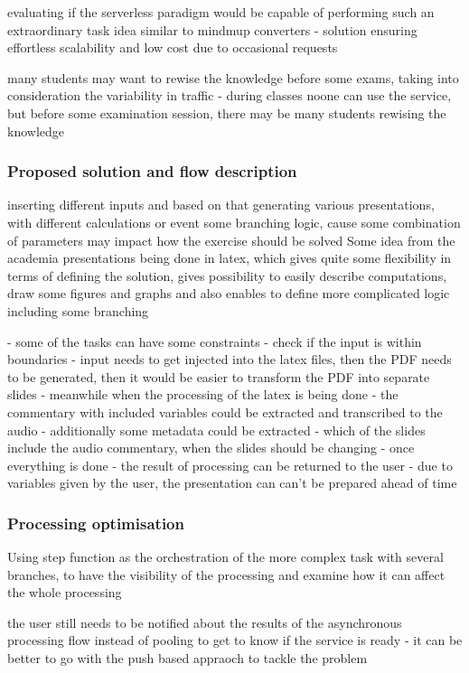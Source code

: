 evaluating if the serverless paradigm would be capable of performing such an extraordinary task
idea similar to mindmup converters - solution ensuring effortless scalability and low cost due to occasional requests

many students may want to rewise the knowledge before some exams, taking into consideration the variability in traffic - during classes noone can use the service, but before some examination session, there may be many students rewising the knowledge

\subsubsection{Proposed solution and flow description}

inserting different inputs and based on that generating various presentations, with different calculations or event some branching logic, cause some combination of parameters may impact how the exercise should be solved
Some idea from the academia presentations being done in latex, which gives quite some flexibility in terms of defining the solution, gives possibility to easily describe computations, draw some figures and graphs and also enables to define more complicated logic including some branching 

- some of the tasks can have some constraints - check if the input is within boundaries
- input needs to get injected into the latex files, then the PDF needs to be generated, then it would be easier to transform the PDF into separate slides
- meanwhile when the processing of the latex is being done - the commentary with included variables could be extracted and transcribed to the audio
- additionally some metadata could be extracted - which of the slides include the audio commentary, when the slides should be changing
- once everything is done - the result of processing can be returned to the user
- due to variables given by the user, the presentation can can't be prepared ahead of time

\subsubsection{Processing optimisation}

Using step function as the orchestration of the more complex task with several branches, to have the visibility of the processing and examine how it can affect the whole processing

the user still needs to be notified about the results of the asynchronous processing flow
instead of pooling to get to know if the service is ready - it can be better to go with the push based appraoch to tackle the problem

